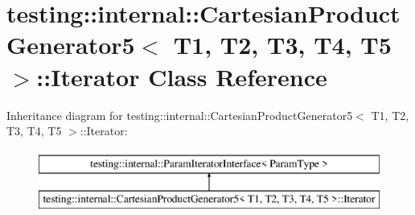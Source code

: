 \hypertarget{classtesting_1_1internal_1_1_cartesian_product_generator5_1_1_iterator}{}\section{testing\+:\+:internal\+:\+:Cartesian\+Product\+Generator5$<$ T1, T2, T3, T4, T5 $>$\+:\+:Iterator Class Reference}
\label{classtesting_1_1internal_1_1_cartesian_product_generator5_1_1_iterator}
Inheritance diagram for testing\+:\+:internal\+:\+:Cartesian\+Product\+Generator5$<$ T1, T2, T3, T4, T5 $>$\+:\+:Iterator\+:\begin{figure}[H]
\begin{center}
\leavevmode
\includegraphics[height=2.000000cm]{classtesting_1_1internal_1_1_cartesian_product_generator5_1_1_iterator}
\end{center}
\end{figure}
